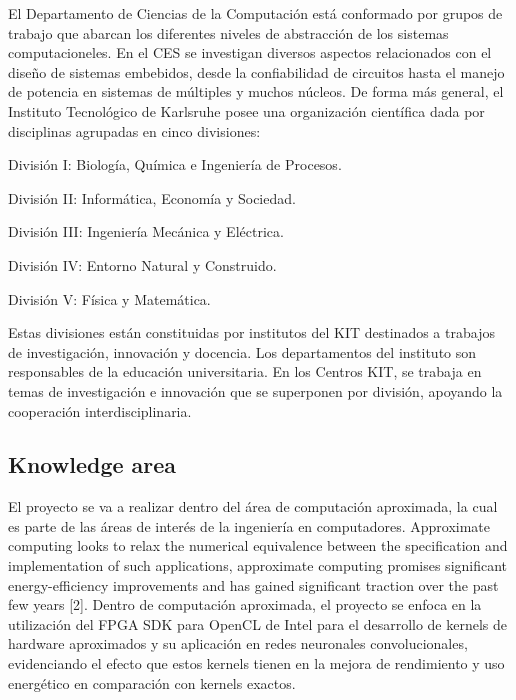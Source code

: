 El Departamento de Ciencias de la Computación está conformado por grupos de trabajo que abarcan los
diferentes niveles de abstracción de los sistemas computacioneles. En el CES se investigan diversos 
aspectos relacionados con el diseño de sistemas embebidos, desde la confiabilidad de circuitos
hasta el manejo de potencia en sistemas de múltiples y muchos núcleos. De forma más general, el
Instituto Tecnológico de Karlsruhe posee una organización científica dada por disciplinas agrupadas en
cinco divisiones:

\begin{compactitem}
    \item División I: Biología, Química e Ingeniería de Procesos.
    \item División II: Informática, Economía y Sociedad.
    \item División III: Ingeniería Mecánica y Eléctrica.
    \item División IV: Entorno Natural y Construido.
    \item División V: Física y Matemática.
\end{compactitem}

Estas divisiones están constituidas por institutos del KIT destinados a trabajos de investigación,
innovación y docencia. Los departamentos del instituto son responsables de la educación universitaria.
En los Centros KIT, se trabaja en temas de investigación e innovación que se superponen por división,
apoyando la cooperación interdisciplinaria.

\subsection{Knowledge area}

El proyecto se va a realizar dentro del área de computación aproximada, la cual es parte de las áreas de
interés de la ingeniería en computadores. Approximate computing looks to relax the numerical equivalence 
between the specification and implementation of such applications, approximate computing promises significant energy-efficiency
improvements and has gained significant traction over
the past few years [2]. Dentro de computación aproximada, el proyecto se enfoca en la utilización del
FPGA SDK para OpenCL de Intel para el desarrollo de kernels de hardware aproximados y su aplicación
en redes neuronales convolucionales, evidenciando el efecto que estos kernels tienen en la mejora de 
rendimiento y uso energético en comparación con kernels exactos. 

